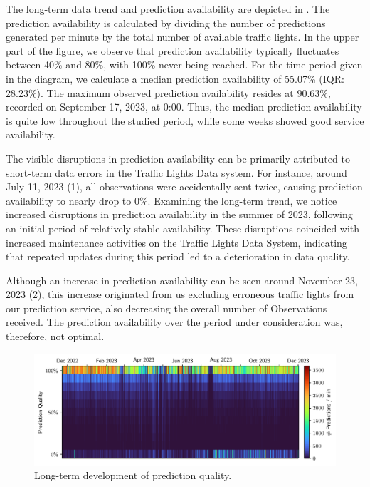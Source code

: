The long-term data trend and prediction availability are depicted in . The prediction availability is calculated by dividing the number of predictions generated per minute by the total number of available traffic lights. In the upper part of the figure, we observe that prediction availability typically fluctuates between 40\% and 80\%, with 100\% never being reached. For the time period given in the diagram, we calculate a median prediction availability of 55.07\% (IQR: 28.23\%). The maximum observed prediction availability resides at 90.63\%, recorded on September 17, 2023, at 0:00. Thus, the median prediction availability is quite low throughout the studied period, while some weeks showed good service availability.

The visible disruptions in prediction availability can be primarily attributed to short-term data errors in the Traffic Lights Data system. For instance, around July 11, 2023 (1), all observations were accidentally sent twice, causing prediction availability to nearly drop to 0\%. Examining the long-term trend, we notice increased disruptions in prediction availability in the summer of 2023, following an initial period of relatively stable availability. These disruptions coincided with increased maintenance activities on the Traffic Lights Data System, indicating that repeated updates during this period led to a deterioration in data quality. 

Although an increase in prediction availability can be seen around November 23, 2023 (2), this increase originated from us excluding erroneous traffic lights from our prediction service, also decreasing the overall number of Observations received. The prediction availability over the period under consideration was, therefore, not optimal.

\begin{figure}[t]
    \centering
    \includegraphics[width=\linewidth]{images/monitoring-long-term-study.pdf}
    \caption{Long-term development of prediction quality.}\label{fig:monitoring-long-term-study}
\end{figure}


